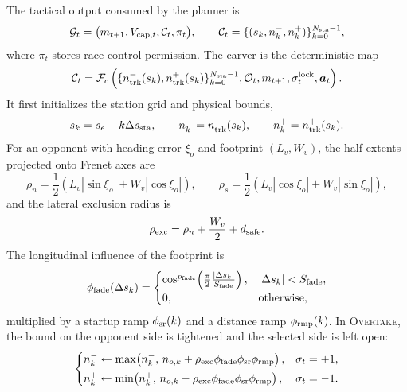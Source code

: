 \documentclass{iopjournal}
\begin{document}
The tactical output consumed by the planner is
\begin{equation}
\mathcal{G}_t=\bigl(m_{t+1},V_{{\rm cap},t},\mathcal{C}_t,\pi_t\bigr),\qquad
\mathcal{C}_t=\{(s_k,n_k^-,n_k^+)\}_{k=0}^{N_{\rm sta}-1},
\label{eq:guidance_tuple}
\end{equation}
where $\pi_t$ stores race-control permission.  The carver is the deterministic
map
\begin{equation}
\mathcal{C}_t=
\mathcal{F}_{c}
\left(
\{n_{\rm trk}^-(s_k),n_{\rm trk}^+(s_k)\}_{k=0}^{N_{\rm sta}-1},
\mathcal{O}_t,m_{t+1},\sigma_t^{\rm lock},\bm{a}_t
\right).
\label{eq:carver_map}
\end{equation}
It first initializes the station grid and physical bounds,
\begin{equation}
s_k=s_e+k\Delta s_{\rm sta},\qquad
n_k^-=n_{\rm trk}^-(s_k),\qquad
n_k^+=n_{\rm trk}^+(s_k).
\label{eq:corridor_init}
\end{equation}
For an opponent with heading error $\xi_o$ and footprint $(L_v,W_v)$, the
half-extents projected onto Frenet axes are
\begin{equation}
\rho_n=\frac{1}{2}(L_v|\sin\xi_o|+W_v|\cos\xi_o|),\qquad
\rho_s=\frac{1}{2}(L_v|\cos\xi_o|+W_v|\sin\xi_o|),
\label{eq:footprint_projection}
\end{equation}
and the lateral exclusion radius is
\begin{equation}
\rho_{\rm exc}=\rho_n+\frac{W_v}{2}+d_{\rm safe}.
\label{eq:rho_exc}
\end{equation}
The longitudinal influence of the footprint is
\begin{equation}
\phi_{\rm fade}(\Delta s_k)=
\begin{cases}
\cos^{p_{\rm fade}}\!\left(\frac{\pi}{2}\frac{|\Delta s_k|}{S_{\rm fade}}\right),
& |\Delta s_k|<S_{\rm fade},\\
0, & \text{otherwise},
\end{cases}
\label{eq:fade}
\end{equation}
multiplied by a startup ramp $\phi_{\rm sr}(k)$ and a distance ramp
$\phi_{\rm rmp}(k)$.  In \textsc{Overtake}, the bound on the opponent side is
tightened and the selected side is left open:
\begin{equation}
\begin{cases}
n_k^- \leftarrow
\max\!\left(n_k^-,\, n_{o,k}+\rho_{\rm exc}\phi_{\rm fade}\phi_{\rm sr}\phi_{\rm rmp}\right),
& \sigma_t=+1,\\[3pt]
n_k^+ \leftarrow
\min\!\left(n_k^+,\, n_{o,k}-\rho_{\rm exc}\phi_{\rm fade}\phi_{\rm sr}\phi_{\rm rmp}\right),
& \sigma_t=-1.
\end{cases}
\label{eq:overtake_bound}
\end{equation}
\end{document}
